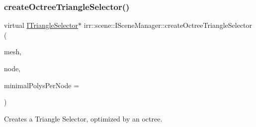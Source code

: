 \subsubsection{\texorpdfstring{create\+Octree\+Triangle\+Selector()}{createOctreeTriangleSelector()}\hspace{0.1cm}{\footnotesize\ttfamily [2/2]}}
{\footnotesize\ttfamily virtual \hyperlink{classirr_1_1scene_1_1ITriangleSelector}{I\+Triangle\+Selector}$\ast$ irr\+::scene\+::\+I\+Scene\+Manager\+::create\+Octree\+Triangle\+Selector (\begin{DoxyParamCaption}\item[{\hyperlink{classirr_1_1scene_1_1IMesh}{I\+Mesh} $\ast$}]{mesh,  }\item[{\hyperlink{classirr_1_1scene_1_1ISceneNode}{I\+Scene\+Node} $\ast$}]{node,  }\item[{\hyperlink{namespaceirr_ac66849b7a6ed16e30ebede579f9b47c6}{s32}}]{minimal\+Polys\+Per\+Node = {} }\end{DoxyParamCaption})\hspace{0.3cm}{\ttfamily [pure virtual]}}



Creates a Triangle Selector, optimized by an octree. 

